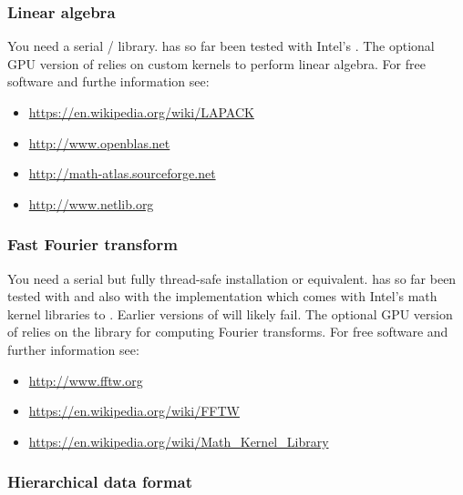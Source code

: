 \documentclass[a4paper, 11pt, DIV=11]{scrartcl}
\begin{document}
\subsubsection{Linear algebra}
\label{sec:linearAlgebra}

You need a serial / library. \nsc has so far been tested with
Intel's . The optional GPU version of \nsc relies on custom \cuda kernels
to perform linear algebra.
For free software and furthe information see:
\begin{itemize}
\item \url{https://en.wikipedia.org/wiki/LAPACK}
\item \url{http://www.openblas.net}
\item \url{http://math-atlas.sourceforge.net}
\item \url{http://www.netlib.org}
\end{itemize}

\subsubsection{Fast Fourier transform}
\label{sec:fftw}

You need a serial but fully thread-safe  installation
or equivalent. \nsc has so far been tested with 
and also with the  implementation which comes with
Intel's math kernel libraries  to .
Earlier versions of  will likely fail. The optional GPU
version of \nsc relies on the  library for computing
Fourier transforms.
For free software and further information see:
\begin{itemize}
\item \url{http://www.fftw.org}
\item \url{https://en.wikipedia.org/wiki/FFTW}
\item \url{https://en.wikipedia.org/wiki/Math_Kernel_Library}
\end{itemize}

\subsubsection{Hierarchical data format}
\label{sec:hdf5}
\end{document}
